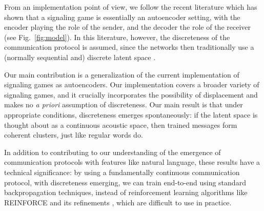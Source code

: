 \documentclass[11pt,a4paper]{article}
\newcommand{\nbEC}[1]{{\leavevmode\color{blue}{\scriptsize#1}}}
\begin{document}
From an implementation point of view, we follow the recent literature which has shown that a signaling game is essentially an autoencoder setting, with the encoder playing the role of the sender, and the decoder the role of the receiver (see Fig.~\ref{fig:model}). In this literature, however, the discreteness of the communication protocol is assumed, since the networks then traditionally use a (normally sequential and) discrete latent space \citep{Havrylov2017, Chaabouni2019a, Kharitonov2019}.  


Our main contribution is a generalization of the current implementation of signaling games as autoencoders.
Our implementation covers a broader variety of signaling games, and it crucially incorporates the possibility of displacement and makes no \emph{a priori} assumption of discreteness. %
Our main result is that under appropriate conditions, discreteness emerges spontaneously: if the latent space is thought about as a continuous acoustic space, then trained messages form coherent clusters, just like regular words do.

In addition to contributing to our understanding of the emergence of communication protocols with features like natural language, these results have a technical significance: by using a fundamentally continuous communication protocol, with discreteness emerging, we can train end-to-end using standard backpropagation techniques, instead of reinforcement learning algorithms like REINFORCE and its refinements \citep{Williams1992, Schulman2015, Mnih2016}, which are difficult to use in practice.
\end{document}
